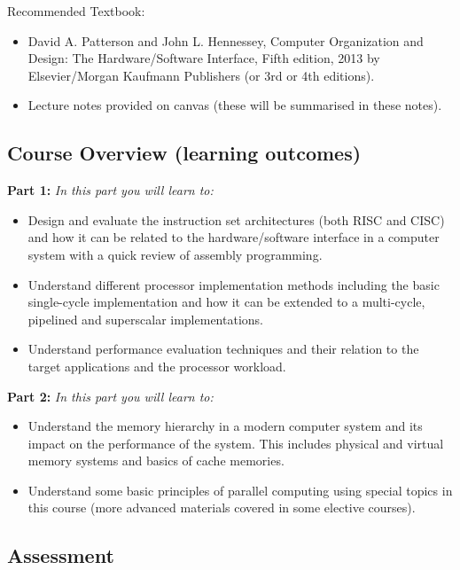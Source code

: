 \documentclass[
  12pt,
  a4paper,
]{report}
\begin{document}
Recommended Textbook:

\begin{itemize}
\item
  David A. Patterson and John L. Hennessey, Computer Organization and
  Design: The Hardware/Software Interface, Fifth edition, 2013 by
  Elsevier/Morgan Kaufmann Publishers (or 3rd or 4th editions).
\item
  Lecture notes provided on canvas (these will be summarised in these
  notes).
\end{itemize}

\label{CourseOverview}
\subsection{Course Overview (learning
outcomes)}\label{course-overview-learning-outcomes}

\textbf{Part 1:} \emph{In this part you will learn to:}

\begin{itemize}
\item
  Design and evaluate the instruction set architectures (both RISC and
  CISC) and how it can be related to the hardware/software interface in
  a computer system with a quick review of assembly programming.
\item
  Understand different processor implementation methods including the
  basic single-cycle implementation and how it can be extended to a
  multi-cycle, pipelined and superscalar implementations.
\item
  Understand performance evaluation techniques and their relation to the
  target applications and the processor workload.
\end{itemize}

\textbf{Part 2:} \emph{In this part you will learn to:}

\begin{itemize}
\item
  Understand the memory hierarchy in a modern computer system and its
  impact on the performance of the system. This includes physical and
  virtual memory systems and basics of cache memories.
\item
  Understand some basic principles of parallel computing using special
  topics in this course (more advanced materials covered in some
  elective courses).
\end{itemize}

\label{Assessment}
\subsection{Assessment}\label{assessment}
\end{document}
